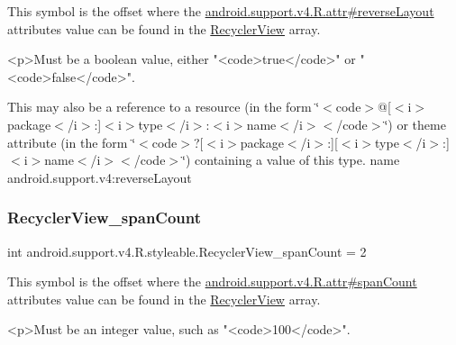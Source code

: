 This symbol is the offset where the \hyperlink{classandroid_1_1support_1_1v4_1_1R_1_1attr_a368d5c0e08a4db3d61d03e203a69d00b}{android.\+support.\+v4.\+R.\+attr\#reverse\+Layout} attribute\textquotesingle{}s value can be found in the \hyperlink{classandroid_1_1support_1_1v4_1_1R_1_1styleable_ad60a429c2c839e07a58e4212d7ffeba0}{Recycler\+View} array.

\begin{DoxyVerb}      <p>Must be a boolean value, either "<code>true</code>" or "<code>false</code>".
\end{DoxyVerb}
 

This may also be a reference to a resource (in the form \char`\"{}$<$code$>$@\mbox{[}$<$i$>$package$<$/i$>$\+:\mbox{]}$<$i$>$type$<$/i$>$\+:$<$i$>$name$<$/i$>$$<$/code$>$\char`\"{}) or theme attribute (in the form \char`\"{}$<$code$>$?\mbox{[}$<$i$>$package$<$/i$>$\+:\mbox{]}\mbox{[}$<$i$>$type$<$/i$>$\+:\mbox{]}$<$i$>$name$<$/i$>$$<$/code$>$\char`\"{}) containing a value of this type.  name android.\+support.\+v4\+:reverse\+Layout \mbox{\label{classandroid_1_1support_1_1v4_1_1R_1_1styleable_a2fc5b4b990851afc287e7ab8f60f18f8}} 
\subsubsection{\texorpdfstring{Recycler\+View\+\_\+span\+Count}{RecyclerView\_spanCount}}
{\footnotesize\ttfamily int android.\+support.\+v4.\+R.\+styleable.\+Recycler\+View\+\_\+span\+Count = 2\hspace{0.3cm}{\ttfamily [static]}}

This symbol is the offset where the \hyperlink{classandroid_1_1support_1_1v4_1_1R_1_1attr_a980e39a37ab6c8e47c77242914200735}{android.\+support.\+v4.\+R.\+attr\#span\+Count} attribute\textquotesingle{}s value can be found in the \hyperlink{classandroid_1_1support_1_1v4_1_1R_1_1styleable_ad60a429c2c839e07a58e4212d7ffeba0}{Recycler\+View} array.

\begin{DoxyVerb}      <p>Must be an integer value, such as "<code>100</code>".
\end{DoxyVerb}
 

